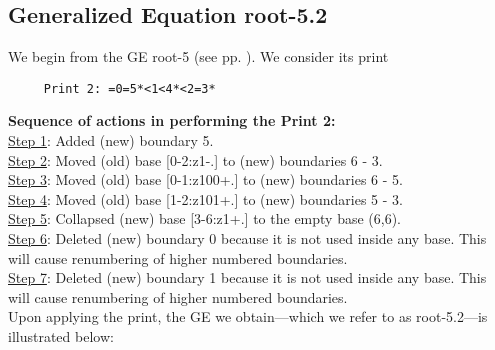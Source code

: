\documentclass[final]{article}
\begin{document}
\subsection*{Generalized Equation root-5.2}
\label{root-5.2}We begin from the GE root-5 (see pp. \pageref{root-5}).  {We consider its print}
\begin{verbatim}
     Print 2: =0=5*<1<4*<2=3*
\end{verbatim}
{\bf Sequence of actions in performing the Print 2:}\\
{\underline{Step 1}:} Added (new) boundary 5.\\
{\underline{Step 2}:} Moved (old) base [0-2:z1-.]  to (new) boundaries 6 - 3.\\
{\underline{Step 3}:} Moved (old) base [0-1:z100+.]  to (new) boundaries 6 - 5.\\
{\underline{Step 4}:} Moved (old) base [1-2:z101+.]  to (new) boundaries 5 - 3.\\
{\underline{Step 5}:} Collapsed (new) base [3-6:z1+.]  to the empty base (6,6).
\\
{\underline{Step 6}:} Deleted (new) boundary 0 because it is not used inside any base.  This will cause renumbering of higher numbered boundaries.
\\
{\underline{Step 7}:} Deleted (new) boundary 1 because it is not used inside any base.  This will cause renumbering of higher numbered boundaries.
\\[0.1in]
{Upon applying the print, the GE we obtain---which we refer to as root-5.2---is illustrated below:}
\end{document}
